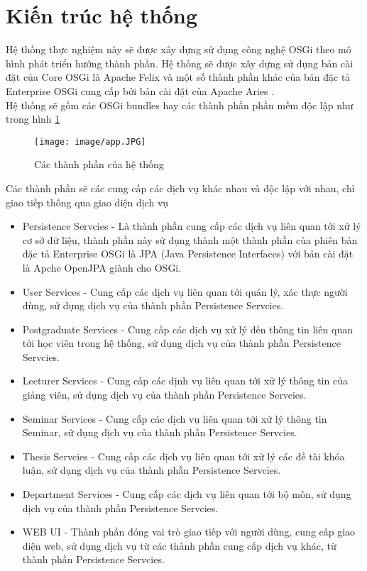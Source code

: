 \section{Kiến trúc hệ thống}
Hệ thống thực nghiệm này sẽ được xây dựng sử dụng công nghệ OSGi theo mô hình phát triển hướng thành phần. Hệ thống sẽ được xây dựng sử dụng bản cài đặt của Core OSGi là Apache Felix \cite{felix} và một số thành phần khác của bản đặc tả Enterprise OSGi cung cấp bởi bản cài đặt của Apache Aries \cite{aries}. \\

Hệ thống sẽ gồm các OSGi bundles hay các thành phần phần mềm độc lập như trong hình \ref{fig:app}
\begin{figure}[htbp]
	\centering
		\texttt{[image: image/app.JPG]}
	\caption{Các thành phần của hệ thống}
	\label{fig:app}
\end{figure}

Các thành phần sẽ các cung cấp các dịch vụ khác nhau và độc lập với nhau, chỉ giao tiếp thông qua giao diện dịch vụ
\begin{itemize}
\item Persistence Servcies - Là thành phần cung cấp các dịch vụ liên quan tới xử lý cơ sở dữ liệu, thành phần này sử dụng thành một thành phần của phiên bản đặc tả Enterprise OSGi là JPA \cite{osgiee5} (Java Persistence Interfaces) với bản cài đặt là Apche OpenJPA \cite{openjpa} giành cho OSGi.
\item User Services - Cung cấp các dịch vụ liên quan tới quản lý, xác thực người dùng, sử dụng dịch vụ của thành phần Persistence Servcies.
\item Postgraduate Services - Cung cấp các dịch vụ xử lý đến thông tin liên quan tới học viên trong hệ thống, sử dụng dịch vụ của thành phần Persistence Servcies.
\item Lecturer Services - Cung cấp các dịnh vụ liên quan tới xử lý thông tin của giảng viên, sử dụng dịch vụ của thành phần Persistence Servcies.
\item Seminar Services - Cung cấp các dịch vụ liên quan tới xử lý thông tin Seminar, sử dụng dịch vụ của thành phần Persistence Servcies.
\item Thesis Servcies - Cung cấp các dịch vụ liên quan tới xử lý các đề tài khóa luận, sử dụng dịch vụ của thành phần Persistence Servcies.
\item Department Services - Cung cấp các dịch vụ liên quan tới bộ môn, sử dụng dịch vụ của thành phần Persistence Servcies.
\item WEB UI - Thành phần đóng vai trò giao tiếp với người dùng, cung cấp giao diện web, sử dụng dịch vụ từ các thành phần cung cấp dịch vụ khác, từ thành phần Persistence Servcies.
\end{itemize}

